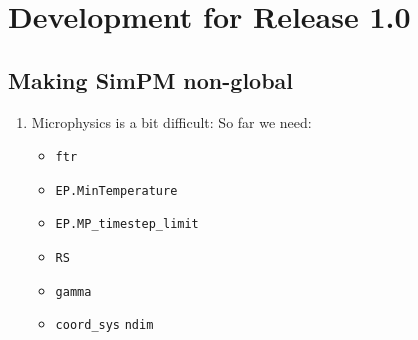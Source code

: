 \documentclass[a4paper,11pt]{article}
\begin{document}
\section{Development for Release 1.0}

\subsection{Making SimPM non-global}

\begin{enumerate}
\item Microphysics is a bit difficult:  So far we need:
\begin{itemize}
\item \verb|ftr|
\item \verb|EP.MinTemperature|
\item \verb|EP.MP_timestep_limit|
\item \verb|RS|
\item \verb|gamma|
\item \verb|coord_sys|
\time \verb|ndim|
\end{itemize}
\end{enumerate}

%
\end{document}
